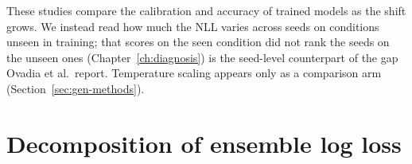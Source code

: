 These studies compare the calibration and accuracy of trained models
as the shift grows. We instead read how much the NLL varies across
seeds on conditions unseen in training; that scores on the seen
condition did not rank the seeds on the unseen ones
(Chapter~\ref{ch:diagnosis}) is the seed-level counterpart of the gap
Ovadia et al.\ report. Temperature scaling appears only as a
comparison arm (Section~\ref{sec:gen-methods}).

\section{Decomposition of ensemble log loss}
\label{sec:related-decomposition}

